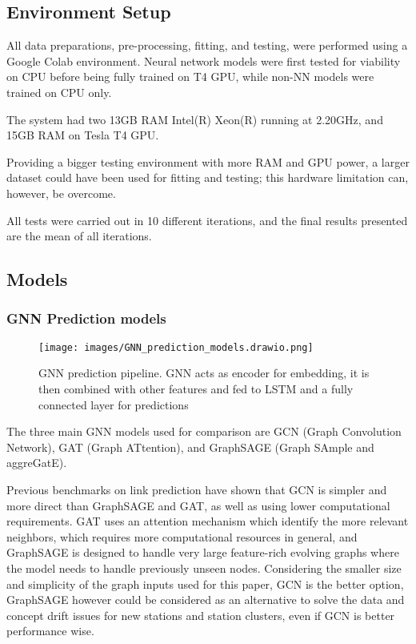 \documentclass{article}
\begin{document}
\subsection{Environment Setup}
All data preparations, pre-processing, fitting, and testing, were performed using a Google Colab environment\cite{Colab}. Neural network models were first tested for viability on CPU before being fully trained on T4 GPU, while non-NN models were trained on CPU only.

The system had two 13GB RAM Intel(R) Xeon(R) running at 2.20GHz, and 15GB RAM on Tesla T4 GPU.

Providing a bigger testing environment with more RAM and GPU power, a larger dataset could have been used for fitting and testing; this hardware limitation can, however, be overcome.

All tests were carried out in 10 different iterations, and the final results presented are the mean of all iterations.

\subsection{Models}

\subsubsection{GNN Prediction models}


\begin{figure}
\centering
\texttt{[image: images/GNN\_prediction\_models.drawio.png]}
\caption{GNN prediction pipeline. GNN acts as encoder for embedding, it is then combined with other features and fed to LSTM and a fully connected layer for predictions}
\label{fig:gnn_prediction_pipeline}
\end{figure}

The three main GNN models used for comparison are GCN (Graph Convolution Network)\cite{Kipft2016}, GAT (Graph ATtention)\cite{veli2018}, and GraphSAGE (Graph SAmple and aggreGatE)\cite{Hamilton2017}.

Previous benchmarks on link prediction have shown that GCN is simpler and more direct than GraphSAGE and GAT, as well as using lower computational requirements\cite{Wang2021}. GAT uses an attention mechanism which identify the more relevant neighbors, which requires more computational resources in general\cite{veli2018}, and GraphSAGE is designed to handle very large feature-rich evolving graphs where the model needs to handle previously unseen nodes\cite{Hamilton2017}. Considering the smaller size and simplicity of the graph inputs used for this paper, GCN is the better option, GraphSAGE however could be considered as an alternative to solve the data and concept drift issues for new stations and station clusters, even if GCN is better performance wise.
\end{document}
